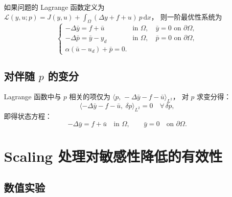 \documentclass[UTF8, 12pt]{ctexart}
\begin{document}
\begin{tcolorbox}[colback=blue!5!white, colframe=blue!60!black, title={注}]
如果问题的 Lagrange 函数定义为
$\mathcal{L}(y,u;p) = J(y,u) + \int_\Omega(\Delta y + f + u)\,p\,\mathrm{d}x$，
则一阶最优性系统为
\begin{equation}
  \begin{cases}
    -\Delta\bar{y} = f + \bar{u}  &\text{in } \Omega,\quad \bar{y}=0 \text{ on } \partial\Omega,\\
    -\Delta\bar{p} = \bar{y}-y_d  &\text{in } \Omega,\quad \bar{p}=0 \text{ on } \partial\Omega,\\
    \alpha(\bar{u}-u_d)+\bar{p}=0.
  \end{cases}
  \label{eq:kkt-alt}
\end{equation}
\end{tcolorbox}

\subsection{对伴随 $p$ 的变分}

Lagrange 函数中与 $p$ 相关的项仅为
$\langle p,\,-\Delta\bar{y}-f-\bar{u}\rangle_{L^2}$，
对 $p$ 求变分得：
\[
  \langle -\Delta\bar{y}-f-\bar{u},\;\delta p\rangle_{L^2} = 0
  \quad\forall\,\delta p,
\]
即得状态方程：
\begin{equation}
  \boxed{-\Delta\bar{y} = f + \bar{u} \quad\text{in } \Omega, \qquad \bar{y}=0 \quad\text{on } \partial\Omega.}
  \label{eq:state}
\end{equation}


\section{Scaling 处理对敏感性降低的有效性}
\label{sec:scaling-effectiveness}
\subsection{数值实验}
\label{sec:experiments}


\end{document}
